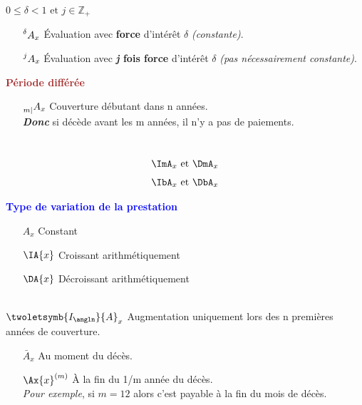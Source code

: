\documentclass[10pt, french]{article}
\begin{document}
\begin{multicols*}{3}
$0 \leq \delta < 1 \text{ et } j \in \mathbb{Z}_+$
\begin{itemize}
	\item[$\prescript{\delta}{}{A}_x$] Évaluation avec \textbf{force} d'intérêt $\delta$ \textit{(constante)}.
	\item[$\prescript{j}{}{A}_x$] Évaluation avec \textbf{\textit{j} fois force} d'intérêt $\delta$ \textit{(pas nécessairement constante)}.
\end{itemize}

\textbf{\textcolor{brown}{Période différée}}
\begin{itemize}
	\item[$\prescript{}{m|}A_{x}$] Couverture débutant dans n années.\\
	\textbf{\textit{Donc}} si décède avant les m années, il n'y a pas de paiements.
\end{itemize}

\textbf{{\color{violet}{Fréquence de variation}}} \\
{\color{violet}{variation m fois par année}}
\begin{align*}
	\ImA_{x} \text{ et } \DmA_{x} 
\end{align*}
{}
\begin{align*}
	\IbA_x \text{ et } \DbA_x 
\end{align*}

\textbf{\textcolor{blue}{Type de variation de la prestation}}
\begin{itemize}
	\item[$A_{x}$] Constant
	\item[$\IA{x}$] Croissant arithmétiquement
	\item[$\DA{x}$] Décroissant arithmétiquement
\end{itemize}

\textbf{{}}\\
$\twoletsymb{I_{\angln}}{A}_{x}$ Augmentation uniquement lors des n premières années de couverture.

\textbf{{}}
\begin{itemize}
	\item[$\bar{A}_x$] Au moment du décès.
	\item[$\Ax{x}^{(m)}$] À la fin du 1/m année du décès.\\
	\textit{Pour exemple}, si $m = 12$ alors c'est payable à la fin du mois de décès.
\end{itemize}


\end{multicols*}
\end{document}
